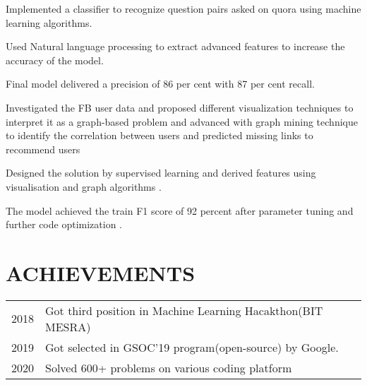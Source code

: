 \documentclass[]{deedy-resume-openfont}
\begin{document}
\begin{minipage}[t]{0.66\textwidth}
Implemented a classifier to recognize question pairs asked on quora using machine
learning algorithms.
\begin{tightemize}
\item Used Natural language processing to extract advanced features to increase the
accuracy of the model.
\item Final model delivered a precision of 86 per cent with 87 per cent recall.
\end{tightemize}
\sectionsep


Investigated the FB user data and proposed different visualization techniques to
interpret it as a graph-based problem and advanced with graph mining technique to
identify the correlation between users and predicted missing links to recommend
users
\begin{tightemize}
\item Designed the solution by supervised learning and derived features using
visualisation and graph algorithms .
\item The model achieved the train F1 score of 92 percent after parameter tuning
and further code optimization .
\end{tightemize}
\sectionsep



\section{ACHIEVEMENTS} 
\begin{tabular}{rll}
2018	       & Got third position in Machine Learning Hacakthon(BIT MESRA)\\
2019        & Got selected in GSOC'19 program(open-source) by Google.\\
2020        &Solved 600+ problems on various coding platform
\end{tabular}
\sectionsep



\end{minipage} 
\end{document}
